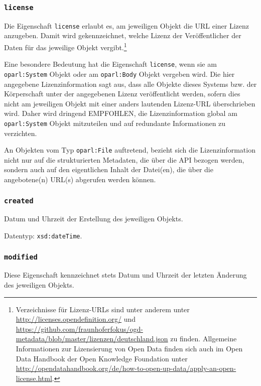 \documentclass[,a4paper]{article}
\begin{document}
\subsubsection{\texttt{license}}\label{license}

Die Eigenschaft \texttt{license} erlaubt es, am jeweiligen Objekt die
URL einer Lizenz anzugeben. Damit wird gekennzeichnet, welche Lizenz der
Veröffentlicher der Daten für das jeweilige Objekt vergibt.\footnote{Verzeichnisse
  für Lizenz-URLs sind unter anderem unter
  \url{http://licenses.opendefinition.org/} und
  \url{https://github.com/fraunhoferfokus/ogd-metadata/blob/master/lizenzen/deutschland.json}
  zu finden. Allgemeine Informationen zur Lizensierung von Open Data
  finden sich auch im Open Data Handbook der Open Knowledge Foundation
  unter
  \url{http://opendatahandbook.org/de/how-to-open-up-data/apply-an-open-license.html}.}

Eine besondere Bedeutung hat die Eigenschaft \texttt{license}, wenn sie
am \texttt{oparl:System} Objekt oder am \texttt{oparl:Body} Objekt
vergeben wird. Die hier angegebene Lizenzinformation sagt aus, dass alle
Objekte dieses Systems bzw. der Körperschaft unter der angegebenen
Lizenz veröffentlicht werden, sofern dies nicht am jeweiligen Objekt mit
einer anders lautenden Lizenz-URL überschrieben wird. Daher wird
dringend EMPFOHLEN, die Lizenzinformation global am
\texttt{oparl:System} Objekt mitzuteilen und auf redundante
Informationen zu verzichten.

An Objekten vom Typ \texttt{oparl:File} auftretend, bezieht sich die
Lizenzinformation nicht nur auf die strukturierten Metadaten, die über
die API bezogen werden, sondern auch auf den eigentlichen Inhalt der
Datei(en), die über die angebotene(n) URL(s) abgerufen werden können.

\subsubsection{\texttt{created}}\label{created}

Datum und Uhrzeit der Erstellung des jeweiligen Objekts.

Datentyp: \texttt{xsd:dateTime}.

\subsubsection{\texttt{modified}}\label{modified}

Diese Eigenschaft kennzeichnet stets Datum und Uhrzeit der letzten
Änderung des jeweiligen Objekts.
\end{document}
